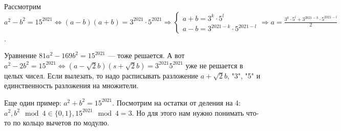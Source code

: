Рассмотрим $a^2 - b^2 = 15^{2021} \iff (a-b)(a + b) = 3^{2021} \cdot 5^{2021} \Rightarrow \begin{cases} a+b=3^k \cdot 5^l \\ a-b=3^{2021-k} \cdot 5^{2021-l} \end{cases} \Rightarrow a = \frac{3^k \cdot 5^l + 3^{2021-k} \cdot 5^{2021-l}}{2}$.  

Уравнение $81a^2-169b^2=15^{2021}$ --- тоже решается. А вот $a^2-2b^2 = 15^{2021} \iff (a-\sqrt{2}b)(s+\sqrt{2}b) = 3^{2021}5^{2021}$ уже не решается в целых чисел. Если вылезать, то надо расписывать разложение $a+\sqrt{2}b$, "3", "5" и единственность разложения на множители.

Еще один пример:  $a^2+b^2=15^{2021}$. Посмотрим на остатки от деления на 4:  $a^2, b^2 \mod 4 \in \{0, 1\}, 15^{2021} \mod 4 = 3$. Но для этого нам нужно понимать что-то по кольцо вычетов по модулю.


